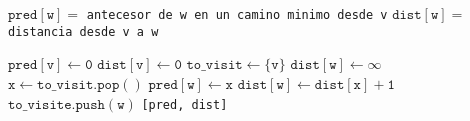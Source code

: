 \begin{algorithmic}
  \State $\mathtt{pred[w] =}$ \texttt{antecesor de w en un camino minimo desde v}
  \State $\mathtt{dist[w] =}$ \texttt{distancia desde v a w}

  \State $\mathtt{pred[v]\gets 0}$
  \State $\mathtt{dist[v]\gets 0}$
  \State $\mathtt{to\_visit \gets \{v\}}$
  \State $\mathtt{dist[w] \gets \infty}$
  \EndFor
  \State $\mathtt{x \gets to\_visit.pop()}$
  \State $\mathtt{pred[w] \gets x}$
  \State $\mathtt{dist[w] \gets dist[x] + 1}$
  \State $\mathtt{to\_visite.push(w)}$
  \EndFor
  \EndWhile
  \State\Return \texttt{[pred, dist]}
  \EndProcedure
\end{algorithmic}